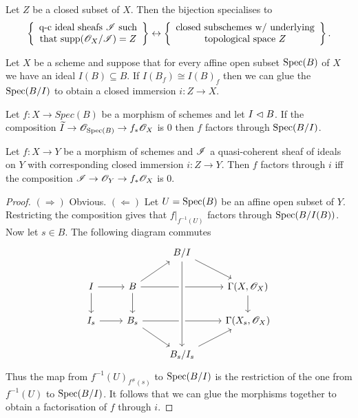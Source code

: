 \documentclass{memoir}
\begin{document}
\begin{remark}
    Let $Z$ be a closed subset of $X$.
    Then the bijection specialises to
    \begin{equation}
        \left\{\begin{array}{c}\text{q-c ideal sheafs } \mathscr{I} \text{ such} \\ \text{that } \text{supp}(\mathscr{O}_X/\mathscr{I}) = Z\end{array}\right\} \leftrightarrow \left\{\begin{array}{c}\text{closed subschemes w/ underlying} \\ \text{topological space } Z \end{array}\right\}.
    \end{equation}
\end{remark}
\begin{remark}
    Let $X$ be a scheme and suppose that for every affine open subset $\operatorname{Spec}(B)$ of $X$ we have an ideal $I(B)\subseteq B$.
    If $I(B_f)\cong I(B)_f$ then we can glue the $\operatorname{Spec}(B/I)$ to obtain a closed immersion $i:Z\to X$.
\end{remark}
\begin{lemma}
    Let $f:X\to Spec(B)$ be a morphism of schemes and let $I\vartriangleleft B$.
    If the composition $\widetilde I \to \mathscr{O}_{\operatorname{Spec}(B)} \to f_*\mathscr{O}_X$ is $0$ then $f$ factors through $\operatorname{Spec}(B/I)$.
\end{lemma}
\begin{proposition}
    Let $f:X\to Y$ be a morphism of schemes and $\mathscr{I}$ a quasi-coherent sheaf of ideals on $Y$ with corresponding closed immersion $i:Z\to Y$.
    Then $f$ factors through $i$ iff the composition $\mathscr{I} \to \mathscr{O}_Y\to f_*\mathscr{O}_X$ is $0$.
\end{proposition}
\begin{proof}
    $(\Rightarrow)$ Obvious.
    $(\Leftarrow)$ Let $U = \operatorname{Spec}(B)$ be an affine open subset of $Y$.
    Restricting the composition gives that $f|_{f^{-1}(U)}$ factors through $\operatorname{Spec}(B/I(B))$.
    Now let $s\in B$.
    The following diagram commutes
    \begin{equation}
        \begin{tikzcd}
            & & B/I \arrow[dr] & \\
            I \arrow[r] \arrow[d] & B \arrow[rr] \arrow[ur] \arrow[d] & & \Gamma(X,\shf O_X) \arrow[d] \\
            I_s \arrow[r] & B_s \arrow[rr] \arrow[dr] & & \Gamma(X_s,\shf O_X) \\
                          & & B_s/I_s \arrow[ru] \arrow[from=uuu,crossing over] &
        \end{tikzcd}
    \end{equation}
    Thus the map from $f^{-1}(U)_{f^\#(s)}$ to $\operatorname{Spec}(B/I)$ is the restriction of the one from $f^{-1}(U)$ to $\operatorname{Spec}(B/I)$.
    It follows that we can glue the morphisms together to obtain a factorisation of $f$ through $i$.
\end{proof}
\end{document}
